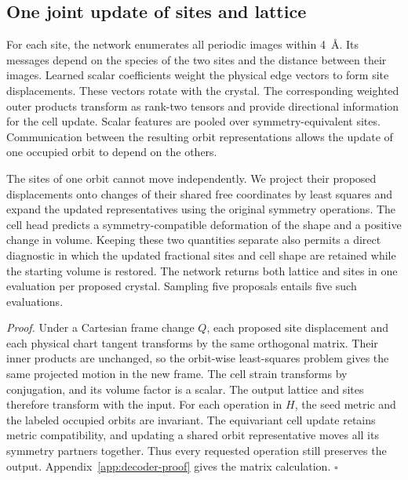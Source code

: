 \subsection{One joint update of sites and lattice}

For each site, the network enumerates all periodic images within 4~\AA. Its messages depend on the species of the two sites and the distance between their images. Learned scalar coefficients weight the physical edge vectors to form site displacements. These vectors rotate with the crystal. The corresponding weighted outer products transform as rank-two tensors and provide directional information for the cell update. Scalar features are pooled over symmetry-equivalent sites. Communication between the resulting orbit representations allows the update of one occupied orbit to depend on the others.

The sites of one orbit cannot move independently. We project their proposed displacements onto changes of their shared free coordinates by least squares and expand the updated representatives using the original symmetry operations. The cell head predicts a symmetry-compatible deformation of the shape and a positive change in volume. Keeping these two quantities separate also permits a direct diagnostic in which the updated fractional sites and cell shape are retained while the starting volume is restored. The network returns both lattice and sites in one evaluation per proposed crystal. Sampling five proposals entails five such evaluations.


\emph{Proof.} Under a Cartesian frame change \(Q\), each proposed site displacement and each physical chart tangent transforms by the same orthogonal matrix. Their inner products are unchanged, so the orbit-wise least-squares problem gives the same projected motion in the new frame. The cell strain transforms by conjugation, and its volume factor is a scalar. The output lattice and sites therefore transform with the input. For each operation in \(H\), the seed metric and the labeled occupied orbits are invariant. The equivariant cell update retains metric compatibility, and updating a shared orbit representative moves all its symmetry partners together. Thus every requested operation still preserves the output. Appendix~\ref{app:decoder-proof} gives the matrix calculation. \(\square\)


